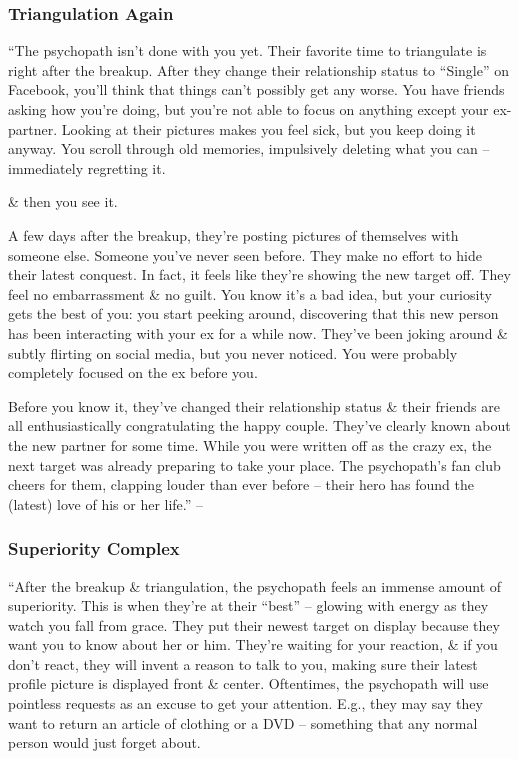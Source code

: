 \documentclass{article}
\numberwithin{equation}{section}
\begin{document}
\subsubsection{Triangulation Again}
``The psychopath isn't done with you yet. Their favorite time to triangulate is right after the breakup. After they change their relationship status to ``Single'' on Facebook, you'll think that things can't possibly get any worse. You have friends asking how you're doing, but you're not able to focus on anything except your ex-partner. Looking at their pictures makes you feel sick, but you keep doing it anyway. You scroll through old memories, impulsively deleting what you can -- immediately regretting it.

\& then you see it.

A few days after the breakup, they're posting pictures of themselves with someone else. Someone you've never seen before. They make no effort to hide their latest conquest. In fact, it feels like they're showing the new target off. They feel no embarrassment \& no guilt. You know it's a bad idea, but your curiosity gets the best of you: you start peeking around, discovering that this new person has been interacting with your ex for a while now. They've been joking around \& subtly flirting on social media, but you never noticed. You were probably completely focused on the ex before you.

Before you know it, they've changed their relationship status \& their friends are all enthusiastically congratulating the happy couple. They've clearly known about the new partner for some time. While you were written off as the crazy ex, the next target was already preparing to take your place. The psychopath's fan club cheers for them, clapping louder than ever before -- their hero has found the (latest) love of his or her life.'' -- \cite[p. 75]{MacKenzie2015}

\subsubsection{Superiority Complex}
``After the breakup \& triangulation, the psychopath feels an immense amount of superiority. This is when they're at their ``best'' -- glowing with energy as they watch you fall from grace. They put their newest target on display because they want you to know about her or him. They're waiting for your reaction, \& if you don't react, they will invent a reason to talk to you, making sure their latest profile picture is displayed front \& center. Oftentimes, the psychopath will use pointless requests as an excuse to get your attention. E.g., they may say they want to return an article of clothing or a DVD -- something that any normal person would just forget about.
\end{document}
